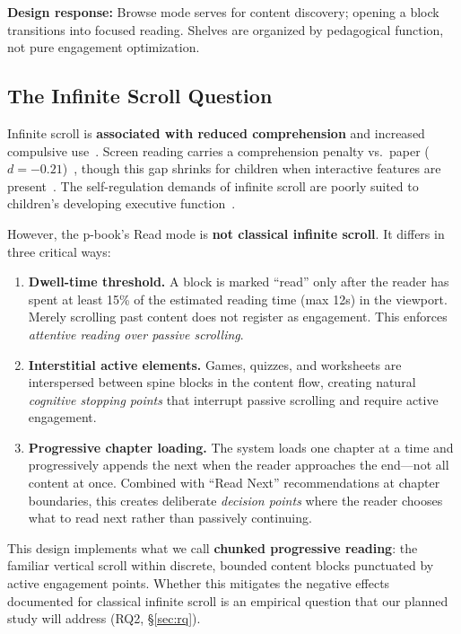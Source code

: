 \documentclass[11pt,a4paper]{article}
\begin{document}
\textbf{Design response:} Browse mode serves for content discovery; opening a block transitions into focused reading. Shelves are organized by pedagogical function, not pure engagement optimization.

\subsection{The Infinite Scroll Question}\label{sec:scroll}

Infinite scroll is \textbf{associated with reduced comprehension} and increased compulsive use~\cite{sera2023,rixen2023}. Screen reading carries a comprehension penalty vs.\ paper ($d{=}-0.21$)~\cite{delgado2018}, though this gap shrinks for children when interactive features are present~\cite{furenes2021}. The self-regulation demands of infinite scroll are poorly suited to children's developing executive function~\cite{vedechkina2021}.

However, the p-book's Read mode is \textbf{not classical infinite scroll}. It differs in three critical ways:

\begin{enumerate}
  \item \textbf{Dwell-time threshold.} A block is marked ``read'' only after the reader has spent at least 15\% of the estimated reading time (max 12s) in the viewport. Merely scrolling past content does not register as engagement. This enforces \emph{attentive reading over passive scrolling}.
  \item \textbf{Interstitial active elements.} Games, quizzes, and worksheets are interspersed between spine blocks in the content flow, creating natural \emph{cognitive stopping points} that interrupt passive scrolling and require active engagement.
  \item \textbf{Progressive chapter loading.} The system loads one chapter at a time and progressively appends the next when the reader approaches the end---not all content at once. Combined with ``Read Next'' recommendations at chapter boundaries, this creates deliberate \emph{decision points} where the reader chooses what to read next rather than passively continuing.
\end{enumerate}

This design implements what we call \textbf{chunked progressive reading}: the familiar vertical scroll within discrete, bounded content blocks punctuated by active engagement points. Whether this mitigates the negative effects documented for classical infinite scroll is an empirical question that our planned study will address (RQ2, \S\ref{sec:rq}).
\end{document}
